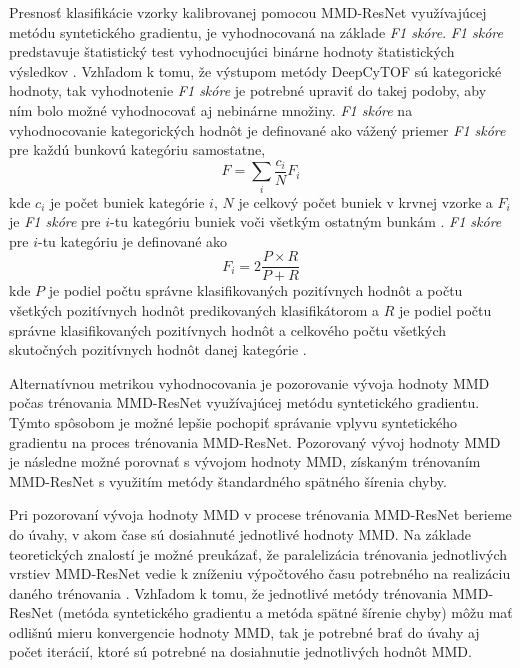 Presnosť klasifikácie vzorky kalibrovanej pomocou MMD-ResNet využívajúcej metódu syntetického gradientu, je vyhodnocovaná na základe \textit{F1 skóre}. \textit{F1 skóre} predstavuje štatistický test vyhodnocujúci binárne hodnoty štatistických výsledkov \cite{sasaki2007truth}. Vzhľadom k tomu, že výstupom metódy DeepCyTOF sú kategorické hodnoty, tak vyhodnotenie \textit{F1 skóre} je potrebné upraviť do takej podoby, aby ním bolo možné vyhodnocovať aj nebinárne množiny. \textit{F1 skóre} na vyhodnocovanie kategorických hodnôt je definované ako vážený priemer \textit{F1 skóre} pre každú bunkovú kategóriu samostatne, 
\begin{equation}
    F=\sum_i \frac{c_i}{N}F_i
\end{equation}
kde $c_i$ je počet buniek kategórie $i$, $N$ je celkový počet buniek v krvnej vzorke a $F_i$ je \textit{F1 skóre} pre $i$-tu kategóriu buniek voči všetkým ostatným bunkám \cite{Li2017}. \textit{F1 skóre} pre $i$-tu kategóriu je definované ako 
\begin{equation}
F_i=2\frac{P \times R}{P + R}
\end{equation}
kde $P$ je podiel počtu správne klasifikovaných pozitívnych hodnôt a počtu všetkých pozitívnych hodnôt predikovaných klasifikátorom a $R$ je podiel počtu správne klasifikovaných pozitívnych hodnôt a celkového počtu všetkých skutočných pozitívnych hodnôt danej kategórie \cite{sasaki2007truth}.

Alternatívnou metrikou vyhodnocovania je pozorovanie vývoja hodnoty MMD počas trénovania MMD-ResNet využívajúcej metódu syntetického gradientu. Týmto spôsobom je možné lepšie pochopiť správanie vplyvu syntetického gradientu na proces trénovania MMD-ResNet. Pozorovaný vývoj hodnoty MMD je následne možné porovnať s vývojom hodnoty MMD, získaným trénovaním MMD-ResNet s využitím metódy štandardného spätného šírenia chyby.

Pri pozorovaní vývoja hodnoty MMD v procese trénovania MMD-ResNet berieme do úvahy, v akom čase sú dosiahnuté jednotlivé hodnoty MMD. Na základe teoretických znalostí je možné preukázať, že paralelizácia trénovania jednotlivých vrstiev MMD-ResNet vedie k zníženiu výpočtového času potrebného na realizáciu daného trénovania \cite{Jaderberg2016, Czarnecki2017}. Vzhľadom k tomu, že jednotlivé metódy trénovania MMD-ResNet (metóda syntetického gradientu a metóda spätné šírenie chyby) môžu mať odlišnú mieru konvergencie hodnoty MMD, tak je potrebné brať do úvahy aj počet iterácií, ktoré sú potrebné na dosiahnutie jednotlivých hodnôt MMD.


